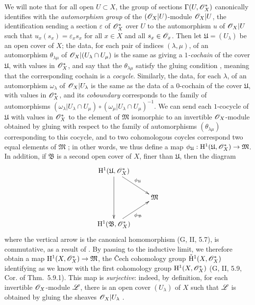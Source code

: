 \begin{env}[5.4.7]
We will note that for all open $U\subset X$, the group of sections $\Gamma(U,\mathscr{O}_X^*)$ canonically identifies with the \emph{automorphism group} of the $(\mathscr{O}_X|U)$-module $\mathscr{O}_X|U$, the identification sending a section $\varepsilon$ of $\mathscr{O}_X^*$ over $U$ to the automorphism $u$ of $\mathscr{O}_X|U$ such that $u_x(s_x)=\varepsilon_x s_x$ for all $x\in X$ and all $s_x\in\mathscr{O}_x$.
Then let $\mathfrak{U}=(U_\lambda)$ be an open cover of $X$; the data, for each pair of indices $(\lambda,\mu)$, of an automorphism $\theta_{\lambda\mu}$ of $\mathscr{O}_X|(U_\lambda\cap U_\mu)$ is the same as giving a \emph{$1$-cochain} of the cover $\mathfrak{U}$, with values in $\mathscr{O}_X^*$, and say that the $\theta_{\lambda\mu}$ satisfy the gluing condition , meaning that the corresponding cochain is a \emph{cocycle}.
Similarly, the data, for each $\lambda$, of an automorphism $\omega_\lambda$ of $\mathscr{O}_X|U_\lambda$ is the same as the data of a $0$-cochain of the cover $\mathfrak{U}$, with values in $\mathscr{O}_X^*$, and its \emph{coboundary} corresponds to the family of automorphisms $(\omega_\lambda|U_\lambda\cap U_\mu)\circ(\omega_\mu|U_\lambda\cap U_\mu)^{-1}$.
We can send each $1$-cocycle of $\mathfrak{U}$ with values in $\mathscr{O}_X^*$ to the element of $\mathfrak{M}$ isomorphic to an invertible $\mathscr{O}_X$-module obtained by gluing with respect to the family of automorphisms $(\theta_{\lambda\mu})$ corresponding to this cocycle, and to two cohomologous coycles correspond two equal elements of $\mathfrak{M}$ ;
in other words, we thus define a map $\vphi_\mathfrak{U}:\HH^1(\mathfrak{U},\sh{O}_X^*)\to\mathfrak{M}$.
In addition, if $\mathfrak{B}$ is a second open cover of $X$, finer than $\mathfrak{U}$, then the diagram
\[
  \xymatrix{
    \HH^1(\mathfrak{U},\sh{O}_X^*)\ar[rd]^{\vphi_\mathfrak{U}}\ar[dd]\\
    & \mathfrak{M}\\
    \HH^1(\mathfrak{B},\sh{O}_X^*)\ar[ur]_{\vphi_\mathfrak{B}}
  }
\]
where the vertical arrow is the canonical homomorphism (G, II, 5.7), is commutative, as a result of .
By passing to the inductive limit, we therefore obtain a map $\HH^1(X,\sh{O}_X^*)\to\mathfrak{M}$, the \v Cech cohomology group $\check{\mathrm{H}}^1(X,\mathscr{O}_X^*)$ identifying as we know with the first cohomology group $\mathrm{H}^1(X,\mathscr{O}_X^*)$ (G, II, 5.9, Cor. of Thm.~5.9.1).
This map is \emph{surjective}: indeed, by definition, for each invertible $\mathscr{O}_X$-module $\mathscr{L}$, there is an open cover $(U_\lambda)$ of $X$ such that $\mathscr{L}$ is obtained by gluing the sheaves $\mathscr{O}_X|U_\lambda$ .

\end{env}
